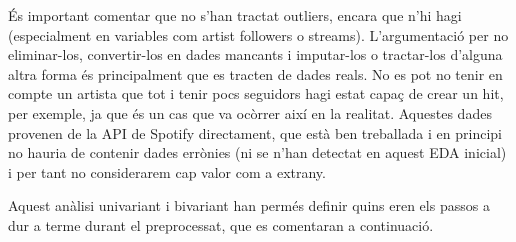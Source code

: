 És important comentar que no s’han tractat outliers, encara que n’hi hagi (especialment en variables com artist followers o streams). L’argumentació per no eliminar-los, convertir-los en dades mancants i imputar-los o tractar-los d’alguna altra forma és principalment que es tracten de dades reals. No es pot no tenir en compte un artista que tot i tenir pocs seguidors hagi estat capaç de crear un hit, per exemple, ja que és un cas que va ocòrrer així en la realitat. Aquestes dades provenen de la API de Spotify directament, que està ben treballada i en principi no hauria de contenir dades errònies (ni se n’han detectat en aquest EDA inicial) i per tant no considerarem cap valor com a extrany.

Aquest anàlisi univariant i bivariant han permés definir quins eren els passos a dur a terme durant el preprocessat, que es comentaran a continuació.